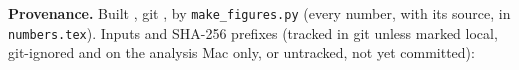 \documentclass[10pt]{article}
\begin{document}
{\tiny\color{ink2}\textbf{Provenance.} Built \BuildDate, git \BuildGit, by \texttt{make\_figures.py}
(every number, with its source, in \texttt{numbers.tex}). Inputs and SHA-256 prefixes (tracked in git unless
marked local, git-ignored and on the analysis Mac only, or untracked, not yet committed): \ProvenanceList\par}
\end{document}

